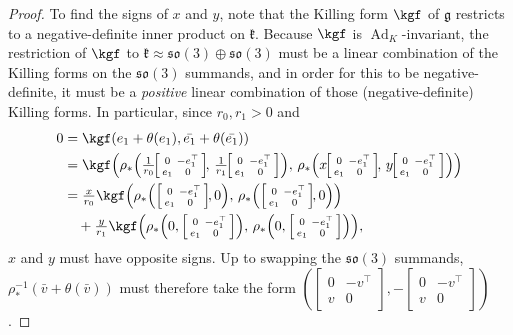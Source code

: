 \documentclass[12pt,a4paper]{amsart}
\theoremstyle{definition}
\DeclareMathOperator{\Ad}{Ad}
\newenvironment{smallbmatrix}
  {\left[\begin{smallmatrix}}
  {\end{smallmatrix}\right]}
\begin{document}
\begin{proof}
To find the signs of $x$ and $y$, note that the Killing form $\kgf$ of $\mathfrak{g}$ restricts to a negative-definite inner product on $\mathfrak{k}$. Because $\kgf$ is $\Ad_K$-invariant, the restriction of $\kgf$ to $\mathfrak{k}\approx\mathfrak{so}(3)\oplus\mathfrak{so}(3)$ must be a linear combination of the Killing forms on the $\mathfrak{so}(3)$ summands, and in order for this to be negative-definite, it must be a \textit{positive} linear combination of those (negative-definite) Killing forms. In particular, since $r_0,r_1>0$ and
\begin{align*}0 & =\kgf(e_1+\theta(e_1),\bar{e_1}+\theta(\bar{e_1})) \\ & =\kgf\!\left(\rho_*\!\left(\tfrac{1}{r_0}\!\begin{smallbmatrix}0 & -e_1^\top \\ e_1 & 0\end{smallbmatrix}\!,\,\tfrac{1}{r_1}\!\begin{smallbmatrix}0 & -e_1^\top \\ e_1 & 0\end{smallbmatrix}\right)\!,\,\rho_*\!\left(x\!\begin{smallbmatrix}0 & -e_1^\top \\ e_1 & 0\end{smallbmatrix}\!,\,y\!\begin{smallbmatrix}0 & -e_1^\top \\ e_1 & 0\end{smallbmatrix}\right)\right) \\ & =\tfrac{x}{r_0}\kgf\!\left(\rho_*\!\left(\begin{smallbmatrix}0 & -e_1^\top \\ e_1 & 0\end{smallbmatrix}\!,0\right)\!,\,\rho_*\!\left(\begin{smallbmatrix}0 & -e_1^\top \\ e_1 & 0\end{smallbmatrix}\!,0\right)\right) \\ & \quad +\tfrac{y}{r_1}\kgf\!\left(\rho_*\!\left(0,\begin{smallbmatrix}0 & -e_1^\top \\ e_1 & 0\end{smallbmatrix}\right)\!,\,\rho_*\!\left(0,\begin{smallbmatrix}0 & -e_1^\top \\ e_1 & 0\end{smallbmatrix}\right)\right)\!,\end{align*}
$x$ and $y$ must have opposite signs. Up to swapping the $\mathfrak{so}(3)$ summands, $\rho_*^{-1}(\bar{v}+\theta(\bar{v}))$ must therefore take the form $([\begin{smallmatrix}0 & -v^\top \\ v & 0\end{smallmatrix}],-[\begin{smallmatrix}0 & -v^\top \\ v & 0\end{smallmatrix}])$.\mbox{\qedhere}\end{proof}
\end{document}
